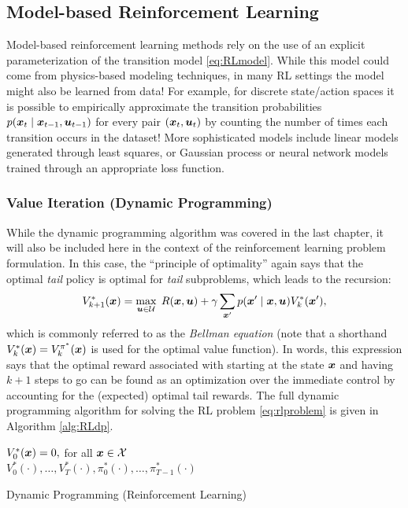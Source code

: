 \subsection{Model-based Reinforcement Learning}
Model-based reinforcement learning methods rely on the use of an explicit parameterization of the transition model \eqref{eq:RLmodel}. While this model could come from physics-based modeling techniques, in many RL settings the model might also be learned from data! For example, for discrete state/action spaces it is possible to empirically approximate the transition probabilities $p(\bm{x}_t \mid \bm{x}_{t-1}, \bm{u}_{t-1})$ for every pair $(\bm{x}_t,\bm{u}_t)$ by counting the number of times each transition occurs in the dataset! More sophisticated models include linear models generated through least squares, or Gaussian process or neural network models trained through an appropriate loss function.

\subsubsection{Value Iteration (Dynamic Programming)}
While the dynamic programming algorithm was covered in the last chapter, it will also be included here in the context of the reinforcement learning problem formulation. In this case, the ``principle of optimality'' again says that the optimal \textit{tail} policy is optimal for \textit{tail} subproblems, which leads to the recursion:
\begin{equation} \label{eq:RLbellman}
V^*_{k+1}(\bm{x}) = \underset{\bm{u} \in \mathcal{U}}{\max} \:\:R(\bm{x}, \bm{u}) + \gamma \sum_{\bm{x}'} p(\bm{x}' \mid \bm{x}, \bm{u}) V^*_{k}(\bm{x}'),
\end{equation}
which is commonly referred to as the \textit{Bellman equation} (note that a shorthand $V^*_{k}(\bm{x}) = V^{\pi^*}_{k}(\bm{x})$ is used for the optimal value function). In words, this expression says that the optimal reward associated with starting at the state $\bm{x}$ and having $k+1$ steps to go can be found as an optimization over the immediate control by accounting for the (expected) optimal tail rewards.
The full dynamic programming algorithm for solving the RL problem \eqref{eq:rlproblem} is given in Algorithm \ref{alg:RLdp}.
\begin{algorithm}[ht]
 $V_0^*(\bm{x}) = 0,$ for all $\bm{x} \in \mathcal{X}$\\
 \Return $V^*_0(\cdot),\dots,V^*_T(\cdot), \pi^*_0(\cdot),\dots,\pi^*_{T-1}(\cdot)$
 \caption{Dynamic Programming (Reinforcement Learning)}
 \label{alg:RLdp}
\end{algorithm}

